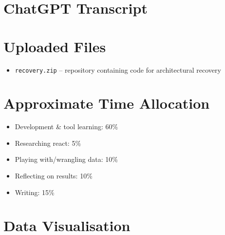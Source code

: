 \documentclass{article}
\begin{document}
\clearpage



\clearpage
\appendix
\section{ChatGPT Transcript}
\label{apx:a}
\begin{figure}[h]

\end{figure}


\clearpage
\section{Uploaded Files}
\label{apx:b}
\begin{itemize}
  \item \verb|recovery.zip| -- repository containing code for architectural recovery
\end{itemize}

\clearpage
\section{Approximate Time Allocation}
\label{apx:c}
\begin{itemize}
  \item Development \& tool learning: 60\%
  \item Researching react: 5\%
  \item Playing with/wrangling data: 10\%
  \item Reflecting on results: 10\%
  \item Writing: 15\%
\end{itemize}

\clearpage
\section{Data Visualisation}
\label{apx:d}
\end{document}

